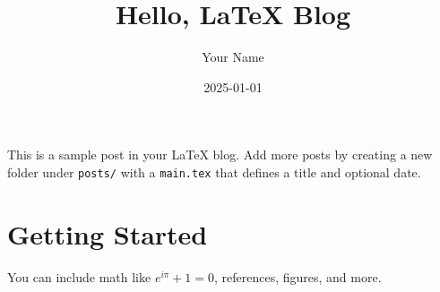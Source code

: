 \documentclass[11pt]{article}
\title{Hello, LaTeX Blog}
\author{Your Name}
\date{2025-01-01}
\begin{document}
\maketitle

This is a sample post in your LaTeX blog. Add more posts by creating a new folder under \texttt{posts/} with a \texttt{main.tex} that defines a title and optional date.

\section*{Getting Started}
You can include math like $e^{i\pi}+1=0$, references, figures, and more.
\end{document}
